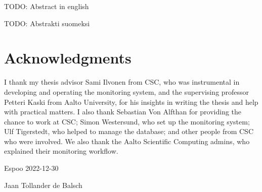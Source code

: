 \makecoverpage
\makecopyrightpage


\begin{abstractpage}[english]
TODO: Abstract in english
\end{abstractpage}



\begin{abstractpage}[finnish]
TODO: Abstrakti suomeksi
\end{abstractpage}


\section*{Acknowledgments}
I thank my thesis advisor Sami Ilvonen from CSC, who was instrumental in developing and operating the monitoring system, and the supervising professor Petteri Kaski from Aalto University, for his insights in writing the thesis and help with practical matters.
I also thank Sebastian Von Alfthan for providing the chance to work at CSC; Simon Westersund, who set up the monitoring system; Ulf Tigerstedt, who helped to manage the database; and other people from CSC who were involved.
We also thank the Aalto Scientific Computing admins, who explained their monitoring workflow.

\vspace{5cm}
Espoo 2022-12-30

\vspace{5mm}
{\hfill Jaan Tollander de Balsch \hspace{1cm}}

\newpage

\setcounter{tocdepth}{2}
\tableofcontents
